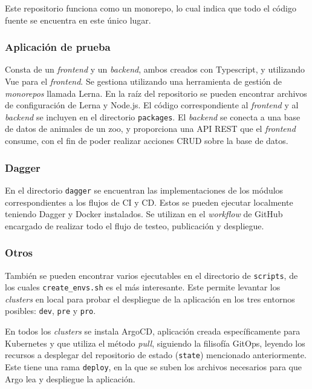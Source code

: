Este repositorio funciona como un monorepo, lo cual indica que todo el código fuente se encuentra en este único lugar.

\subsubsection*{Aplicación de prueba}

Consta de un \textit{frontend} y un \textit{backend}, ambos creados con Typescript, y utilizando Vue para el \textit{frontend}. Se gestiona utilizando una herramienta de gestión de \textit{monorepos} llamada Lerna. En la raíz del repositorio se pueden encontrar archivos de configuración de Lerna y Node.js. El código correspondiente al \textit{frontend} y al \textit{backend} se incluyen en el directorio \texttt{packages}. El \textit{backend} se conecta a una base de datos de animales de un zoo, y proporciona una API REST que el \textit{frontend} consume, con el fin de poder realizar acciones CRUD sobre la base de datos.

\subsubsection*{Dagger}

En el directorio \texttt{dagger} se encuentran las implementaciones de los módulos correspondientes a los flujos de CI y CD. Estos se pueden ejecutar localmente teniendo Dagger y Docker instalados. Se utilizan en el \textit{workflow} de GitHub encargado de realizar todo el flujo de testeo, publicación y despliegue.

\subsubsection*{Otros}

También se pueden encontrar varios ejecutables en el directorio de \texttt{scripts}, de los cuales \texttt{create\_envs.sh} es el más interesante. Este permite levantar los \textit{clusters} en local para probar el despliegue de la aplicación en los tres entornos posibles: \texttt{dev}, \texttt{pre} y \texttt{pro}.

En todos los \textit{clusters} se instala ArgoCD, aplicación creada específicamente para Kubernetes y que utiliza el método \textit{pull}, siguiendo la filisofía GitOps, leyendo los recursos a desplegar del repositorio de estado (\texttt{state}) mencionado anteriormente. Este tiene una rama \texttt{deploy}, en la que se suben los archivos necesarios para que Argo lea y despliegue la aplicación.

